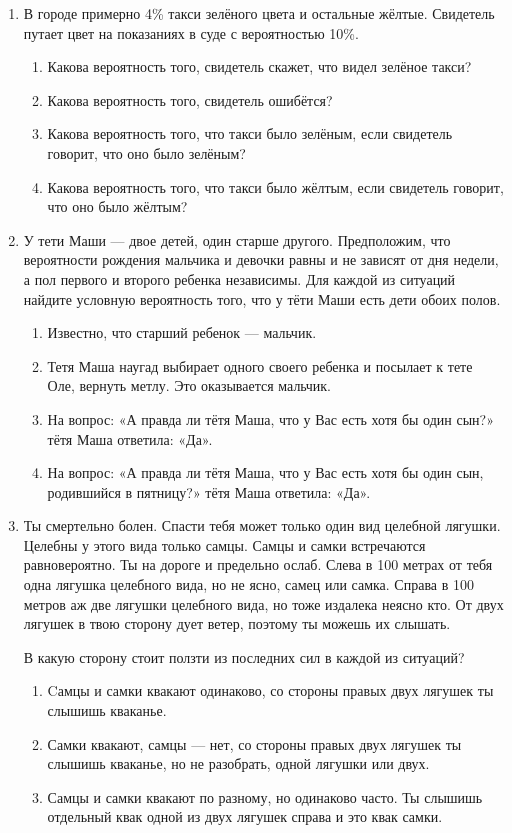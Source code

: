 \documentclass[a4paper, 12pt]{article}
\begin{document}
\newpage
\begin{enumerate}

\item  В городе примерно 4\% такси зелёного цвета и остальные жёлтые. Свидетель путает цвет на показаниях в суде с вероятностью 10\%.

\begin{enumerate}
  \item Какова вероятность того, свидетель скажет, что видел зелёное такси?
  \item Какова вероятность того, свидетель ошибётся?
  \item Какова вероятность того, что такси было зелёным, если свидетель говорит, что оно было зелёным?
  \item Какова вероятность того, что такси было жёлтым, если свидетель говорит, что оно было жёлтым?
\end{enumerate}


\item У тети Маши — двое детей, один старше другого. Предположим, что вероятности рождения мальчика и девочки равны и не зависят от дня недели, а пол первого и второго ребенка независимы. Для каждой из ситуаций найдите условную вероятность того, что у тёти Маши есть дети обоих полов.
\begin{enumerate}
  \item Известно, что старший ребенок — мальчик.
  \item Тетя Маша наугад выбирает одного своего
ребенка и посылает к тете Оле, вернуть метлу. Это оказывается мальчик.
  \item На вопрос: «А правда ли тётя Маша, что у Вас есть хотя бы один сын?» тётя Маша ответила: «Да».
  \item На вопрос: «А правда ли тётя Маша, что у Вас есть хотя бы один сын, родившийся в пятницу?» тётя Маша ответила: «Да».
\end{enumerate}

\item Ты смертельно болен. Спасти тебя может только один вид  целебной лягушки. Целебны у этого вида только самцы. Самцы и самки встречаются равновероятно. Ты на дороге и предельно ослаб. Слева в 100 метрах от тебя одна лягушка целебного вида, но не ясно, самец или самка. Справа в 100 метров аж две лягушки целебного вида, но тоже издалека неясно кто. От двух лягушек в твою сторону дует ветер, поэтому ты можешь их слышать.

В какую сторону стоит ползти из последних сил в каждой из  ситуаций?
\begin{enumerate}
  \item Cамцы и самки квакают одинаково, со стороны правых двух лягушек ты слышишь кваканье.
  \item Самки квакают, самцы — нет, со стороны правых двух лягушек ты слышишь кваканье, но не разобрать, одной лягушки или двух.
  \item Самцы и самки квакают по разному, но одинаково часто. Ты слышишь отдельный квак одной из двух лягушек справа и это квак самки.
\end{enumerate}


\end{enumerate}
\end{document}
